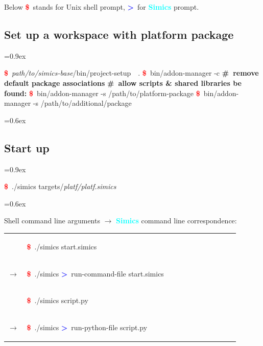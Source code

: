\documentclass[8pt]{extarticle}
\newenvironment{code}[1][]{%
\begin{prebox}[#1]\obeylines%
\fontdimen2\font=0.9ex%
}{%
\end{prebox}%
\fontdimen2\font=0.6ex%
}
\newenvironment{codem}[2][\linewidth]{%
\begin{minipage}{#1}%
\begin{prebox}[colback=#2]\obeylines}{%
\end{prebox}%
\end{minipage}}
\newenvironment{code9}{%
\begin{codem}[0.9\linewidth]{green!10}}{\end{codem}}
\newcommand{\prompt}{\textcolor{red}{\textbf{\$}\ }}
\newcommand{\sprompt}{\textcolor{blue}{\textbf{>}\ }}
\newcommand{\cmtcommon}[1]{\textcolor{Sepia}{\textbf{#1}}}
\newcommand{\cmt}[1]{\cmtcommon{\#\ #1}}
\newcommand{\p}[1]{\textit{\large#1}}
\newcommand{\Simics}{\textcolor{cyan}{\textbf{Simics}}}
\begin{document}
\begin{multicols*}{3}
    Below \prompt stands for Unix shell prompt, \sprompt for \Simics{} prompt.

\subsection{Set up a workspace with platform package}
    \begin{code}
        \prompt \p{path/to/simics-base}/bin/project-setup\ \ .
        \prompt bin/addon-manager -c  \cmt{remove default package associations}
        \cmt{allow scripts \& shared libraries be found:}
        \prompt bin/addon-manager -s /path/to/platform-package
        \prompt bin/addon-manager -s /path/to/additional/package
    \end{code}

\subsection{Start up}
    \begin{code}
        \prompt ./simics targets/\p{platf/platf.simics}
    \end{code}

    
    Shell command line arguments $\longrightarrow$ \Simics{} command line 
        correspondence:

    \begin{tabular}{p{0.05\linewidth}p{0.85\linewidth}}
        &
        \begin{code9}
            \prompt ./simics start.simics
        \end{code9}
        \vspace{0.05cm}
        \\
        $\longrightarrow$ &
        \begin{code9}
            \prompt ./simics
            \sprompt run-command-file start.simics
        \end{code9}
        \vspace{0.2cm}
        \\

        & \begin{code9}
            \prompt ./simics script.py
        \end{code9}
        \vspace{0.05cm}
        \\
        $\longrightarrow$ &
        \begin{code9}
            \prompt ./simics
            \sprompt run-python-file script.py
        \end{code9}
        \vspace{0.2cm}
        \\


\end{tabular}
\end{multicols*}
\end{document}
